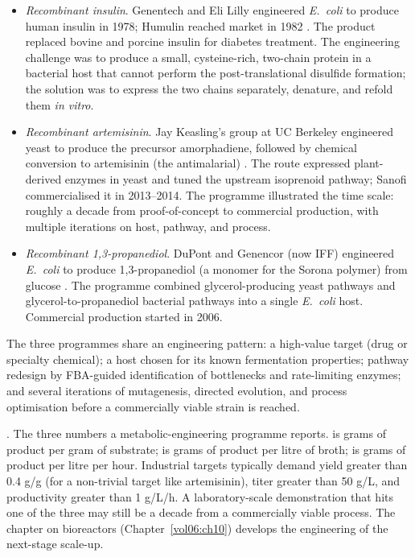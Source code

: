 \begin{itemize}[leftmargin=*]
\item \emph{Recombinant insulin}. Genentech and Eli Lilly engineered
  \emph{E.\ coli} to produce human insulin in 1978; Humulin reached
  market in 1982 \cite[ch.~1]{text:v6c09-demain-industrial-microbiology-2017}.
  The product replaced bovine and porcine insulin for diabetes
  treatment. The engineering challenge was to produce a small,
  cysteine-rich, two-chain protein in a bacterial host that cannot
  perform the post-translational disulfide formation; the solution
  was to express the two chains separately, denature, and refold them
  \emph{in vitro}.
\item \emph{Recombinant artemisinin}. Jay Keasling's group at UC
  Berkeley engineered yeast to produce the precursor amorphadiene,
  followed by chemical conversion to artemisinin (the antimalarial)
  \cite[pp.~528--532]{paper:v6c09-paddon-artemisinin-2013}. The route
  expressed plant-derived enzymes in yeast and tuned the upstream
  isoprenoid pathway; Sanofi commercialised it in 2013--2014. The
  programme illustrated the time scale: roughly a decade from
  proof-of-concept to commercial production, with multiple iterations
  on host, pathway, and process.
\item \emph{Recombinant 1,3-propanediol}. DuPont and Genencor (now
  IFF) engineered \emph{E.\ coli} to produce 1,3-propanediol (a
  monomer for the Sorona polymer) from glucose
  \cite[ch.~9]{text:v6c09-demain-industrial-microbiology-2017}. The
  programme combined glycerol-producing yeast pathways and
  glycerol-to-propanediol bacterial pathways into a single
  \emph{E.\ coli} host. Commercial production started in 2006.
\end{itemize}

The three programmes share an engineering pattern: a high-value
target (drug or specialty chemical); a host chosen for its known
fermentation properties; pathway redesign by FBA-guided
identification of bottlenecks and rate-limiting enzymes; and
several iterations of mutagenesis, directed evolution, and process
optimisation before a commercially viable strain is reached.


. The three numbers a
metabolic-engineering programme reports.  is grams of
product per gram of substrate;  is grams of product
per litre of broth;  is grams of product per
litre per hour. Industrial targets typically demand yield greater
than 0.4 g/g (for a non-trivial target like artemisinin), titer
greater than 50 g/L, and productivity greater than 1 g/L/h. A
laboratory-scale demonstration that hits one of the three may still
be a decade from a commercially viable process. The chapter on
bioreactors (Chapter~\ref{vol06:ch10}) develops the engineering of
the next-stage scale-up.

